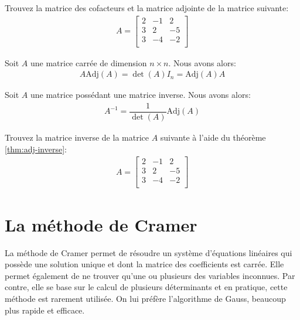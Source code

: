 \documentclass[]{book}
\theoremstyle{definition}
\theoremstyle{definition}
\theoremstyle{definition}
\theoremstyle{remark}
\let\BeginKnitrBlock\begin \let\EndKnitrBlock\end
\begin{document}
\BeginKnitrBlock{example}
\protect\hypertarget{exm:unnamed-chunk-113}{}{\label{exm:unnamed-chunk-113} }Trouvez la matrice des cofacteurs et la matrice adjointe de la matrice suivante:
\begin{align*}
A=\begin{bmatrix}
2&-1&2\\
3&2&-5\\
3&-4&-2\\
\end{bmatrix}
\end{align*}
\EndKnitrBlock{example}

\BeginKnitrBlock{theorem}
\protect\hypertarget{thm:unnamed-chunk-114}{}{\label{thm:unnamed-chunk-114} }Soit \(A\) une matrice carrée de dimension \(n \times n\). Nous avons alors:
\begin{align*}
    A\text{Adj}(A) = \det(A)I_n = \text{Adj}(A)A
\end{align*}
\EndKnitrBlock{theorem}

\BeginKnitrBlock{theorem}
\protect\hypertarget{thm:adj-inverse}{}{\label{thm:adj-inverse} }Soit \(A\) une matrice possédant une matrice inverse. Nous avons alors:
\begin{align*}
A^{-1} = \dfrac{1}{\det(A)}\text{Adj}(A)
\end{align*}
\EndKnitrBlock{theorem}

\BeginKnitrBlock{example}
\protect\hypertarget{exm:unnamed-chunk-115}{}{\label{exm:unnamed-chunk-115} }Trouvez la matrice inverse de la matrice \(A\) suivante à l'aide du théorème \ref{thm:adj-inverse}:
\begin{align*}
A=\begin{bmatrix}
2&-1&2\\
3&2&-5\\
3&-4&-2\\
\end{bmatrix}
\end{align*}
\EndKnitrBlock{example}

\hypertarget{la-muxe9thode-de-cramer}{%
\section{La méthode de Cramer}\label{la-muxe9thode-de-cramer}}

La méthode de Cramer permet de résoudre un système d'équations linéaires qui possède une solution unique et dont la matrice des coefficients est carrée. Elle permet également de ne trouver qu'une ou plusieurs des variables inconnues. Par contre, elle se base sur le calcul de plusieurs déterminants et en pratique, cette méthode est rarement utilisée. On lui préfère l'algorithme de Gauss, beaucoup plus rapide et efficace.
\end{document}
